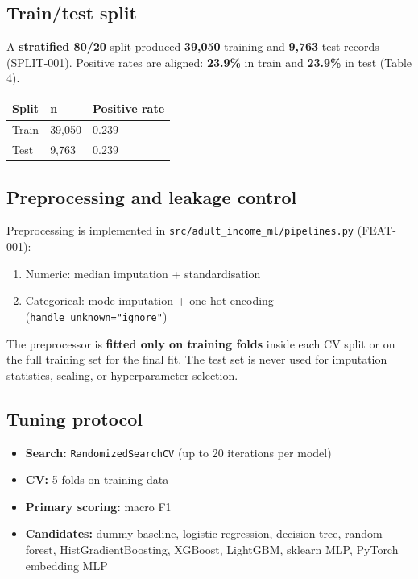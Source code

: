 ﻿\documentclass[11pt,a4paper]{article}
\begin{document}
\subsection{Train/test split}

A \textbf{stratified 80/20} split produced \textbf{39,050} training and \textbf{9,763} test records (SPLIT-001). Positive rates are aligned: \textbf{23.9\%} in train and \textbf{23.9\%} in test (Table 4).

\begin{table}[H]
  \centering
  \small
  \begin{tabular}{lll}
    \toprule
    Split & n & Positive rate \\
    \midrule
    Train & 39,050 & 0.239 \\
    Test & 9,763 & 0.239 \\
    \bottomrule
  \end{tabular}
\end{table}

\subsection{Preprocessing and leakage control}

Preprocessing is implemented in \texttt{src/adult\_income\_ml/pipelines.py} (FEAT-001):

\begin{enumerate}
  \item Numeric: median imputation + standardisation
  \item Categorical: mode imputation + one-hot encoding (\texttt{handle\_unknown="ignore"})
\end{enumerate}

The preprocessor is \textbf{fitted only on training folds} inside each CV split or on the full training set for the final fit. The test set is never used for imputation statistics, scaling, or hyperparameter selection.

\subsection{Tuning protocol}

\begin{itemize}
  \item \textbf{Search:} \texttt{RandomizedSearchCV} (up to 20 iterations per model)
  \item \textbf{CV:} 5 folds on training data
  \item \textbf{Primary scoring:} macro F1
  \item \textbf{Candidates:} dummy baseline, logistic regression, decision tree, random forest, HistGradientBoosting, XGBoost, LightGBM, sklearn MLP, PyTorch embedding MLP
\end{itemize}
\end{document}

